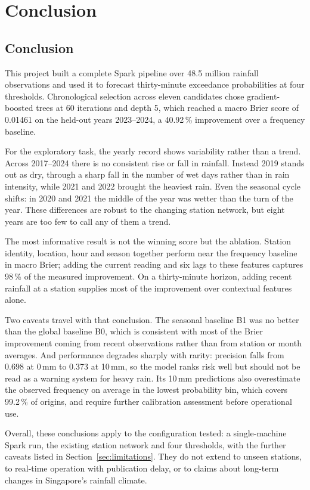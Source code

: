\documentclass[10pt,a4paper,twocolumn,twoside]{rho-class/rho}
\begin{document}
\section{Conclusion}

\subsection{Conclusion}
This project built a complete Spark pipeline over 48.5 million rainfall observations and used it to forecast thirty-minute exceedance probabilities at four thresholds. Chronological selection across eleven candidates chose gradient-boosted trees at 60 iterations and depth 5, which reached a macro Brier score of 0.01461 on the held-out years 2023--2024, a 40.92\,\% improvement over a frequency baseline.

For the exploratory task, the yearly record shows variability rather than a trend. Across 2017--2024 there is no consistent rise or fall in rainfall. Instead 2019 stands out as dry, through a sharp fall in the number of wet days rather than in rain intensity, while 2021 and 2022 brought the heaviest rain. Even the seasonal cycle shifts: in 2020 and 2021 the middle of the year was wetter than the turn of the year. These differences are robust to the changing station network, but eight years are too few to call any of them a trend.

The most informative result is not the winning score but the ablation. Station identity, location, hour and season together perform near the frequency baseline in macro Brier; adding the current reading and six lags to these features captures 98\,\% of the measured improvement. On a thirty-minute horizon, adding recent rainfall at a station supplies most of the improvement over contextual features alone.

Two caveats travel with that conclusion. The seasonal baseline B1 was no better than the global baseline B0, which is consistent with most of the Brier improvement coming from recent observations rather than from station or month averages. And performance degrades sharply with rarity: precision falls from 0.698 at 0\,mm to 0.373 at 10\,mm, so the model ranks risk well but should not be read as a warning system for heavy rain. Its 10\,mm predictions also overestimate the observed frequency on average in the lowest probability bin, which covers 99.2\,\% of origins, and require further calibration assessment before operational use.

Overall, these conclusions apply to the configuration tested: a single-machine Spark run, the existing station network and four thresholds, with the further caveats listed in Section~\ref{sec:limitations}. They do not extend to unseen stations, to real-time operation with publication delay, or to claims about long-term changes in Singapore's rainfall climate.
\end{document}
